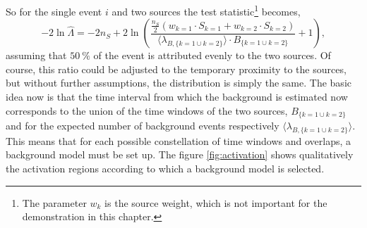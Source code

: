 So for the single event $i$ and two sources the test statistic\footnote{The parameter $w_k$ is the source weight, which is not important for the demonstration in this chapter.} becomes,
\begin{equation}
    -2\ln{\hat{\Lambda}} =-2n_S +2\ln\left(\frac{\frac{n_S}{2}(w_{k=1}\cdot S_{k=1} + w_{k=2} \cdot S_{k=2})}{\langle\lambda_{B,\{k=1\cup k=2\}}\rangle \cdot B_{\{k=1\cup k=2\}}}+1\right) \label{eq:simple_example},
\end{equation}
assuming that $\SI{50}{\percent}$ of the event is attributed evenly to the two sources.
Of course, this ratio could be adjusted to the temporary proximity to the sources, but without further assumptions, the distribution is simply the same.
The basic idea now is that the time interval from which the background is estimated now corresponds to the union of the time windows of the two sources, $B_{\{k=1\cup k=2\}}$ and for the expected number of background events respectively $\langle\lambda_{B,\{k=1\cup k=2\}}\rangle$.
This means that for each possible constellation of time windows and overlaps, a background model must be set up.
The figure \ref{fig:activation} shows qualitatively the activation regions according to which a background model is selected.
